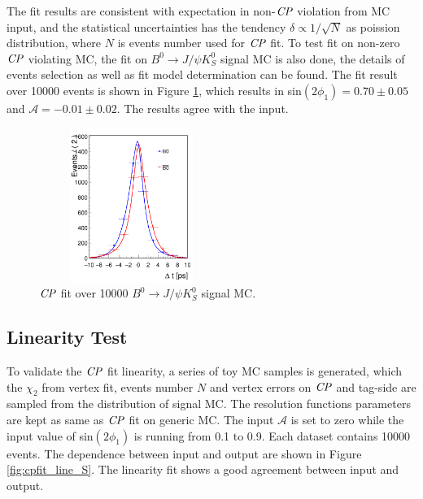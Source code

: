 The fit results are consistent with expectation in non-$\it{CP}$ violation from MC input, and the statistical uncertainties has the tendency $\delta \propto 1/\sqrt{N}$ as poission distribution, where $N$ is events number used for $\it{CP}$ fit. To test fit on non-zero $\it{CP}$ violating MC, the fit on $B^0\to J/\psi K_S^0$ signal MC is also done, the details of events selection as well as fit model determination can be found\cite{jpsiks_ichep}. The fit result over 10000 events is shown in Figure \ref{fig:cpfit_jpsiks}, which results in sin$(2\phi_1) = 0.70 \pm 0.05 $ and $\mathcal{A} = -0.01\pm 0.02$. The results agree with the input.
\begin{figure}[H]
	\centering
	\includegraphics[height=5cm,width=6cm]{figures/jpsiks_cpfit10000}
	\caption{$\it{CP}$ fit over 10000 $B^0\to J/\psi K_S^0$ signal MC. }
	\label{fig:cpfit_jpsiks}
\end{figure}

\subsection{Linearity Test}
To validate the $\it{CP}$ fit linearity, a series of toy MC samples is generated, which the $\chi_2$ from vertex fit, events number $N$ and vertex errors on $\it{CP}$ and tag-side are sampled from the distribution of signal MC. The resolution functions parameters are kept as same as $\it{CP}$ fit on generic MC. The input $\mathcal{A}$ is set to zero while the input value of sin$(2\phi_1)$ is running from 0.1 to 0.9. Each dataset contains 10000 events. The dependence between input and output are shown in Figure \ref{fig:cpfit_line_S}. The linearity fit shows a good agreement between input and output.

